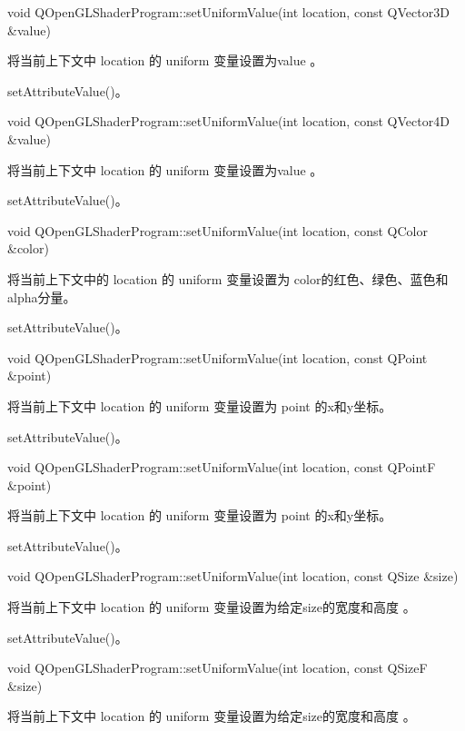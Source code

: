 void QOpenGLShaderProgram::setUniformValue(int location, const QVector3D \&value)

将当前上下文中 location 的 uniform 变量设置为value 。


\begin{seeAlso}
setAttributeValue()。
\end{seeAlso}

void QOpenGLShaderProgram::setUniformValue(int location, const QVector4D \&value)

将当前上下文中 location 的 uniform 变量设置为value 。


\begin{seeAlso}
setAttributeValue()。
\end{seeAlso}

void QOpenGLShaderProgram::setUniformValue(int location, const QColor \&color)

将当前上下文中的 location 的 uniform 变量设置为 color的红色、绿色、蓝色和alpha分量。



\begin{seeAlso}
setAttributeValue()。
\end{seeAlso}

void QOpenGLShaderProgram::setUniformValue(int location, const QPoint \&point)

将当前上下文中 location 的 uniform 变量设置为 point 的x和y坐标。


\begin{seeAlso}
setAttributeValue()。
\end{seeAlso}

void QOpenGLShaderProgram::setUniformValue(int location, const QPointF \&point)


将当前上下文中 location 的 uniform 变量设置为 point 的x和y坐标。


\begin{seeAlso}
setAttributeValue()。
\end{seeAlso}

void QOpenGLShaderProgram::setUniformValue(int location, const QSize \&size)

将当前上下文中 location 的 uniform 变量设置为给定size的宽度和高度 。

\begin{seeAlso}
setAttributeValue()。
\end{seeAlso}

void QOpenGLShaderProgram::setUniformValue(int location, const QSizeF \&size)

将当前上下文中 location 的 uniform 变量设置为给定size的宽度和高度 。

